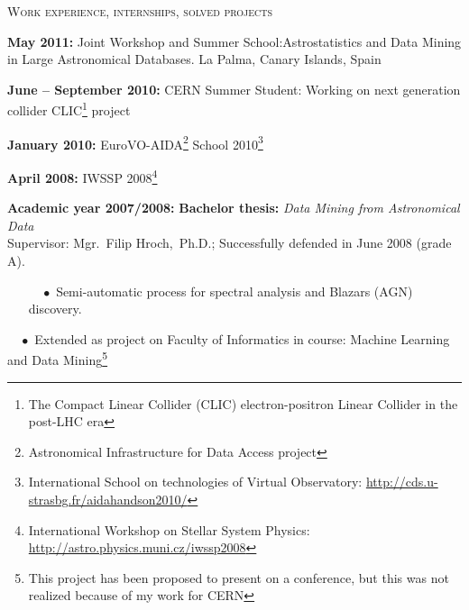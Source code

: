 \documentclass[10pt]{article}
\begin{document}
\begin{cv}
\begin{cvlist}{\large \textsc{Work experience, internships, solved projects}}
\begin{itemize}

 \end{itemize}



\item {\bf{May 2011:}} Joint Workshop and Summer
  School:Astrostatistics and Data Mining in Large Astronomical
  Databases.  La Palma, Canary Islands, Spain

\item {\bf{June -- September 2010:}} CERN Summer Student: Working on
  next generation collider CLIC\footnote{The Compact Linear Collider
    (CLIC) electron-positron Linear Collider in the post-LHC era} project

\item {\bf{January 2010:}} EuroVO-AIDA\footnote{Astronomical
  Infrastructure for Data Access project} School
  2010\footnote{International School on technologies of Virtual
    Observatory:
    \href{http://cds.u-strasbg.fr/aidahandson2010/}{http://cds.u-strasbg.fr/aidahandson2010/}}


\item {\bf{April 2008:}} IWSSP 2008\footnote{International Workshop on
  Stellar System Physics:
  \href{http://astro.physics.muni.cz/iwssp2008}{http://astro.physics.muni.cz/iwssp2008}}



\item {\bf{Academic year 2007/2008:}} {\bf{Bachelor thesis:}}
  \textit{Data Mining from Astronomical Data}\\Supervisor:
  Mgr.~Filip Hroch,~Ph.D.; Successfully defended in June 2008 (grade
  A).
\vspace{-0.3cm}
\begin{itemize}
\item[$\quad \bullet$ \hspace{-1.5mm}] Semi-automatic process for
  spectral analysis and Blazars (AGN) discovery.\\[-5mm]

\end{itemize}

\item[$\quad \bullet$ \hspace{-1.5mm}] Extended as project on Faculty
  of Informatics in course: Machine Learning and Data
  Mining\footnote{This project has been proposed to present on a
    conference, but this was not realized because of my work for CERN
  } \\[-5mm]



\end{cvlist}
\end{cv}
\end{document}

